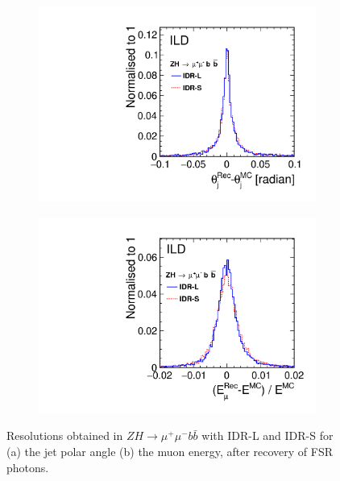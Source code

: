 \begin{figure}[htbp]
\begin{subfigure}{0.49\hsize} \includegraphics[width=\textwidth]{Performance/fig/thetaj1h.pdf}
 \caption{  \label{fig:mh:res:theta}}
 \end{subfigure}
\begin{subfigure}{0.49\hsize} \includegraphics[width=\textwidth]{Performance/fig/elep1.pdf}
 \caption{  \label{fig:mh:res:Elep}}
 \end{subfigure}
\caption{Resolutions obtained  in $ZH \to \mu^+ \mu^- b\bar{b}$ with IDR-L and IDR-S for 
(a) the jet polar angle
(b) the muon energy, after recovery of FSR photons. 
}
\label{fig:mh:res:etheta}
\end{figure}

